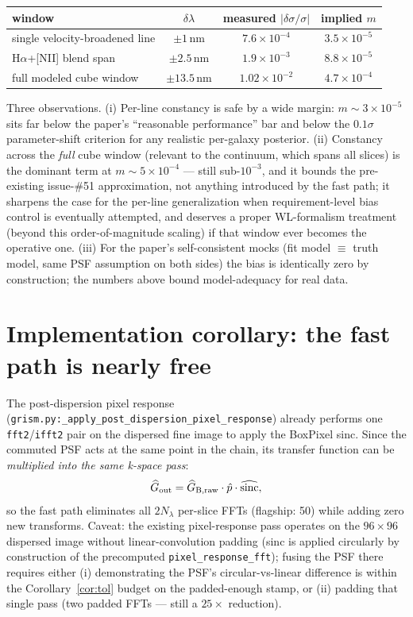 \documentclass[11pt]{article}
\newcommand{\code}[1]{\texttt{#1}}
\begin{document}
\begin{center}
\begin{tabular}{lccc}
\toprule
window & $\delta\lambda$ & measured $|\delta\sigma/\sigma|$ & implied $m$ \\
\midrule
single velocity-broadened line & $\pm1$\,nm & $7.6\times10^{-4}$ & $3.5\times10^{-5}$ \\
H$\alpha$+[NII] blend span & $\pm2.5$\,nm & $1.9\times10^{-3}$ & $8.8\times10^{-5}$ \\
full modeled cube window & $\pm13.5$\,nm & $1.02\times10^{-2}$ & $4.7\times10^{-4}$ \\
\bottomrule
\end{tabular}
\end{center}

Three observations. (i) Per-line constancy is safe by a wide margin:
$m \sim 3\times10^{-5}$ sits far below the paper's ``reasonable
performance'' bar and below the $0.1\sigma$ parameter-shift criterion for
any realistic per-galaxy posterior. (ii) Constancy across the \emph{full}
cube window (relevant to the continuum, which spans all slices) is the
dominant term at $m \sim 5\times10^{-4}$ --- still sub-$10^{-3}$, and it
bounds the pre-existing issue-\#51 approximation, not anything introduced by
the fast path; it sharpens the case for the per-line generalization when
requirement-level bias control is eventually attempted, and deserves a
proper WL-formalism treatment (beyond this order-of-magnitude scaling) if
that window ever becomes the operative one. (iii) For the paper's
self-consistent mocks (fit model $\equiv$ truth model, same PSF assumption
on both sides) the bias is identically zero by construction; the numbers
above bound model-adequacy for real data.

\section{Implementation corollary: the fast path is nearly free}
\label{sec:impl}

The post-dispersion pixel response
(\code{grism.py:\_apply\_post\_dispersion\_pixel\_response}) already performs
one \code{fft2}/\code{ifft2} pair on the dispersed fine image to apply the
BoxPixel sinc. Since the commuted PSF acts at the same point in the chain,
its transfer function can be \emph{multiplied into the same k-space pass}:
\[
\widehat{G}_{\rm out} = \widehat{G}_{\rm B,raw} \cdot \hat p \cdot
\widehat{\rm sinc},
\]
so the fast path eliminates all $2N_\lambda$ per-slice FFTs (flagship: 50)
while adding zero new transforms. Caveat: the existing pixel-response pass
operates on the $96\times96$ dispersed image without linear-convolution
padding (sinc is applied circularly by construction of the precomputed
\code{pixel\_response\_fft}); fusing the PSF there requires either
(i) demonstrating the PSF's circular-vs-linear difference is within the
Corollary~\ref{cor:tol} budget on the padded-enough stamp, or (ii) padding
that single pass (two padded FFTs --- still a $25\times$ reduction).
\end{document}
